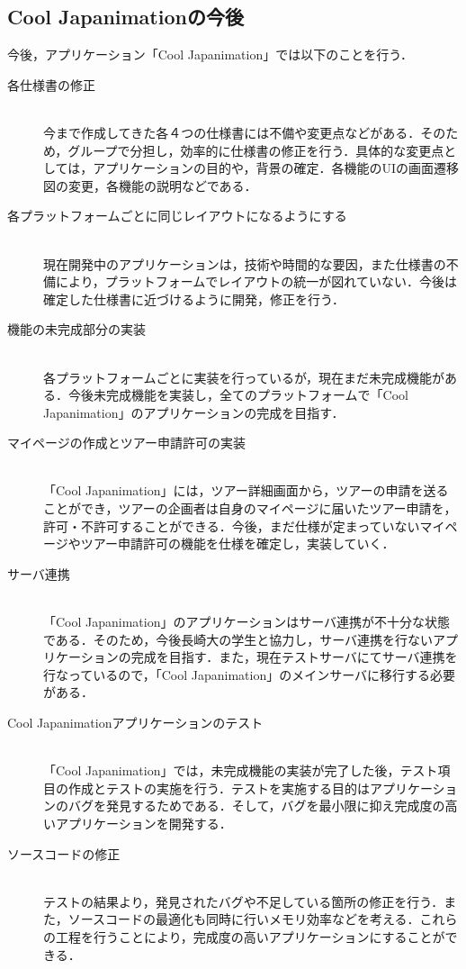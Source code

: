 \subsection{Cool Japanimationの今後}
\par
今後，アプリケーション「Cool Japanimation」では以下のことを行う．
\begin{description}
\item[各仕様書の修正]\mbox{}\\
今まで作成してきた各４つの仕様書には不備や変更点などがある．そのため，グループで分担し，効率的に仕様書の修正を行う．具体的な変更点としては，アプリケーションの目的や，背景の確定．各機能のUIの画面遷移図の変更，各機能の説明などである．
\item[各プラットフォームごとに同じレイアウトになるようにする]\mbox{}\\
現在開発中のアプリケーションは，技術や時間的な要因，また仕様書の不備により，プラットフォームでレイアウトの統一が図れていない．今後は確定した仕様書に近づけるように開発，修正を行う．
\item[機能の未完成部分の実装]\mbox{}\\
各プラットフォームごとに実装を行っているが，現在まだ未完成機能がある．今後未完成機能を実装し，全てのプラットフォームで「Cool Japanimation」のアプリケーションの完成を目指す．
\item[マイページの作成とツアー申請許可の実装]\mbox{}\\
「Cool Japanimation」には，ツアー詳細画面から，ツアーの申請を送ることができ，ツアーの企画者は自身のマイページに届いたツアー申請を，許可・不許可することができる．今後，まだ仕様が定まっていないマイページやツアー申請許可の機能を仕様を確定し，実装していく．
\item[サーバ連携]\mbox{}\\
「Cool Japanimation」のアプリケーションはサーバ連携が不十分な状態である．そのため，今後長崎大の学生と協力し，サーバ連携を行ないアプリケーションの完成を目指す．また，現在テストサーバにてサーバ連携を行なっているので，「Cool Japanimation」のメインサーバに移行する必要がある．
\item[Cool Japanimationアプリケーションのテスト]\mbox{}\\
「Cool Japanimation」では，未完成機能の実装が完了した後，テスト項目の作成とテストの実施を行う．テストを実施する目的はアプリケーションのバグを発見するためである．そして，バグを最小限に抑え完成度の高いアプリケーションを開発する．
\item[ソースコードの修正]\mbox{}\\
テストの結果より，発見されたバグや不足している箇所の修正を行う．また，ソースコードの最適化も同時に行いメモリ効率などを考える．これらの工程を行うことにより，完成度の高いアプリケーションにすることができる．

\end{description}
